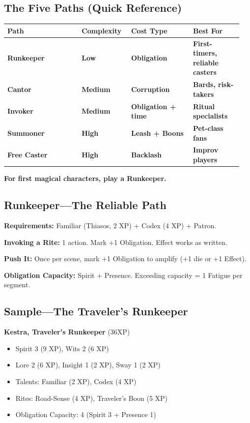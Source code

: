 \documentclass[10pt,twocolumn]{article} %
\begin{document}
\subsection{The Five Paths (Quick Reference)}
\begin{coretable}
\begin{tabular}{>{\bfseries}p{0.3\linewidth} >{\bfseries}p{0.2\linewidth} >{\bfseries}p{0.25\linewidth} >{\bfseries}p{0.2\linewidth}}
\toprule
\textbf{Path} & \textbf{Complexity} & \textbf{Cost Type} & \textbf{Best For} \\
\midrule
Runkeeper & Low & Obligation & First-timers, reliable casters \\
Cantor & Medium & Corruption & Bards, risk-takers \\
Invoker & Medium & Obligation + time & Ritual specialists \\
Summoner & High & Leash + Boons & Pet-class fans \\
Free Caster & High & Backlash & Improv players \\
\bottomrule
\end{tabular}
\end{coretable}
\textbf{For first magical characters, play a Runkeeper.}

\subsection{Runkeeper---The Reliable Path}
\textbf{Requirements:} Familiar (Thiasos, 2 XP) + Codex (4 XP) + Patron.

\textbf{Invoking a Rite:} 1 action. Mark +1 Obligation. Effect works as written.

\textbf{Push It:} Once per scene, mark +1 Obligation to amplify (+1 die or +1 Effect).

\textbf{Obligation Capacity:} Spirit + Presence. Exceeding capacity = 1 Fatigue per segment.

\subsection{Sample---The Traveler's Runkeeper}
\begin{sidebar}
    \textbf{Kestra, Traveler's Runkeeper} (36XP)
    \begin{itemize}[leftmargin=*]
        \item Spirit 3 (9 XP), Wits 2 (6 XP)
        \item Lore 2 (6 XP), Insight 1 (2 XP), Sway 1 (2 XP)
        \item Talents: Familiar (2 XP), Codex (4 XP)
        \item Rites: Road-Sense (4 XP), Traveler's Boon (5 XP)
        \item Obligation Capacity: 4 (Spirit 3 + Presence 1)
    \end{itemize}
\end{sidebar}
\end{document}
